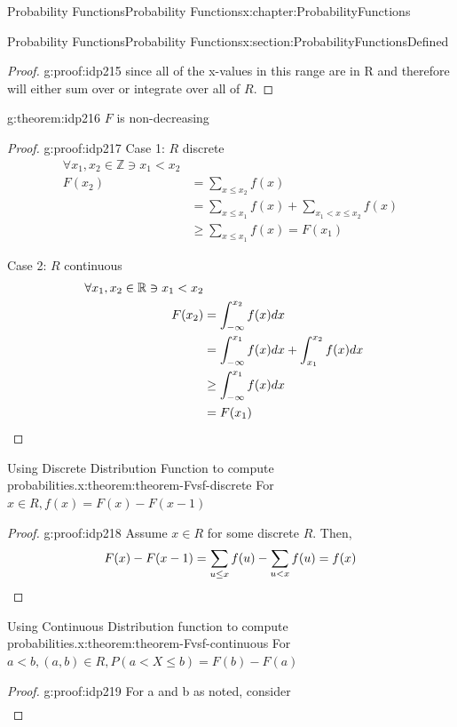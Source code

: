 \documentclass[oneside,10pt,]{book}
\newcommand{\qedhere}{\relax}
\numberwithin{equation}{section}
\newcommand{\lt}{<}
\begin{document}
\begin{chapterptx}{Probability Functions}{}{Probability Functions}{}{}{x:chapter:ProbabilityFunctions}
\begin{sectionptx}{Probability Functions}{}{Probability Functions}{}{}{x:section:ProbabilityFunctionsDefined}
\begin{proof}{}{g:proof:idp215}
since all of the x-values in this range are in R and therefore will either sum over or integrate over all of \(R\).%
\end{proof}
%
\par
\begin{theorem}{}{}{g:theorem:idp216}%
\(F\) is non-decreasing%
\end{theorem}
\begin{proof}{}{g:proof:idp217}
Case 1: \(R\) discrete%
\begin{align*}
\forall x_1,x_2 \in \mathbb{Z} \ni x_1 \lt x_2\\
F(x_2) & = \sum_{x \le x_2} f(x) \\
& = \sum_{x \le x_1} f(x) + \sum_{x_1 \lt x \le x_2} f(x)\\
& \ge \sum_{x \le x_1} f(x) = F(x_1)
\end{align*}
%
\par
Case 2: \(R\) continuous%
\begin{align*}
\forall x_1,x_2 \in \mathbb{R} \ni x_1 \lt x_2\\
F(x_2) & = \int_{-\infty}^{x_2} f(x) dx \\
& = \int_{-\infty}^{x_1} f(x) dx + \int_{x_1}^{x_2} f(x) dx\\
& \ge \int_{-\infty}^{x_1} f(x) dx\\
& = F(x_1)\qedhere
\end{align*}
%
\end{proof}
%
\par
\begin{theorem}{Using Discrete Distribution Function to compute probabilities.}{}{x:theorem:theorem-Fvsf-discrete}%
For \(x \in R, f(x) = F(x) - F(x-1)\)%
\end{theorem}
\begin{proof}{}{g:proof:idp218}
Assume \(x \in R\) for some discrete \(R\). Then,%
\begin{equation*}
F(x) - F(x-1) = \sum_{u \le x} f(u) - \sum_{u \lt x} f(u) = f(x)\qedhere
\end{equation*}
%
\end{proof}
%
\par
\begin{theorem}{Using Continuous Distribution function to compute probabilities.}{}{x:theorem:theorem-Fvsf-continuous}%
For \(a \lt b, (a,b) \in R, P(a \lt X \le b) = F(b) - F(a)\)%
\end{theorem}
\begin{proof}{}{g:proof:idp219}
For a and b as noted, consider%
\begin{align*}

\end{align*}
\end{proof}
\end{sectionptx}
\end{chapterptx}
\end{document}
